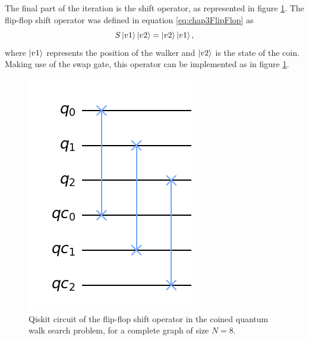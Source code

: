\documentclass[../../dissertation.tex]{subfiles}
\begin{document}
The final part of the iteration is the shift operator, as represented in figure
\ref{fig:coinedQWSearchShiftCircuitQistkit}. The flip-flop shift operator was
defined in equation \eqref{eq:chap3FlipFlop} as
\begin{equation}
        S\ket{v1}\ket{v2} = \ket{v2}\ket{v1},
        \label{eq:chap4FlipFlop}
\end{equation}
where $\ket{v1}$ represents the position of the walker and $\ket{v2}$ is the
state of the coin. Making use of the swap gate, this operator can be
implemented as in figure \ref{fig:coinedQWSearchShiftCircuitQistkit}.
\begin{figure}[!h]
	\centering
	\includegraphics[scale=0.27]{img/Qiskit/CoinedQuantumWalk/Search/Circuits/CoinedSearchQiskitCircShift_N3_M4_S5.png}
	\caption{Qiskit circuit of the  flip-flop shift operator in the coined quantum walk search problem, for a complete graph of size $N=8$.} 
	\label{fig:coinedQWSearchShiftCircuitQistkit}
\end{figure}\par
\end{document}
